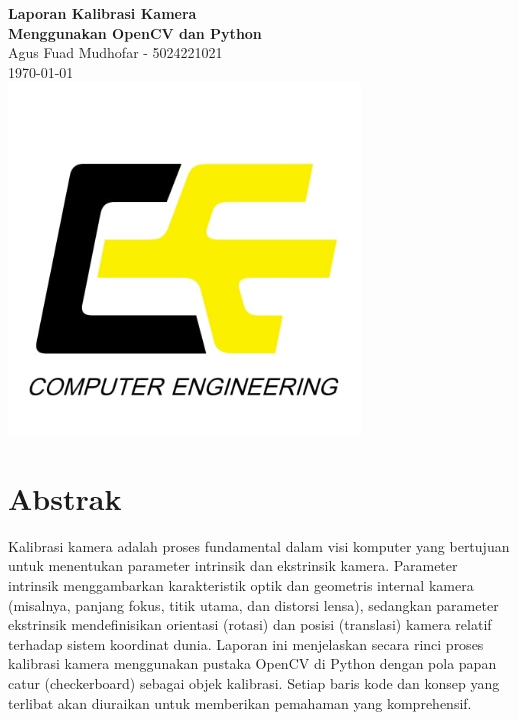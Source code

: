 \documentclass[12pt,a4paper]{article}
\begin{document}

\begin{titlepage}
    \begin{center}
        \vspace*{1cm}
        {\LARGE \textbf{Laporan Kalibrasi Kamera\\Menggunakan OpenCV dan Python}}\\[1.5cm]
        {\large Agus Fuad Mudhofar - 5024221021}\\[0.3cm]
        {\large \today}\\
        \includegraphics[width=0.7\textwidth]{Computer-Engineering-1.jpg}\\[1cm]
    \end{center}
\end{titlepage}
\thispagestyle{empty}
\newpage

\tableofcontents
\newpage

\section{Abstrak}
Kalibrasi kamera adalah proses fundamental dalam visi komputer yang bertujuan
untuk menentukan parameter intrinsik dan ekstrinsik kamera. Parameter intrinsik
menggambarkan karakteristik optik dan geometris internal kamera (misalnya,
panjang fokus, titik utama, dan distorsi lensa), sedangkan parameter ekstrinsik
mendefinisikan orientasi (rotasi) dan posisi (translasi) kamera relatif
terhadap sistem koordinat dunia. Laporan ini menjelaskan secara rinci proses
kalibrasi kamera menggunakan pustaka OpenCV di Python dengan pola papan catur
(checkerboard) sebagai objek kalibrasi. Setiap baris kode dan konsep yang
terlibat akan diuraikan untuk memberikan pemahaman yang komprehensif.
\end{document}
